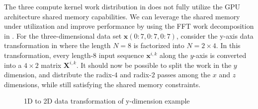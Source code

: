\documentclass[11pt, onecolumn, journal,compsoc]{IEEEtran}
\theoremstyle{problemstyle}
\begin{document}
    The three compute kernel work distribution in  does not fully utilize the GPU architecture shared memory capabilities. We can leverage the shared memory under utilization and improve performance by using the FFT work decomposition in . For the three-dimensional data set $\bm{x}(0 \colon 7,0 \colon 7,0 \colon 7)$, consider the y-axis data transformation in  where the length $N=8$ is factorized into $N = 2 \times 4$. In this transformation, every length-$8$ input sequence $\bm{x}^{i,k}$ along the $y$-axis is converted into a $4 \times 2$ matrix $\bm{X}^{i,k}$. It should now be possible to split the work in the $y$ dimension, and distribute the radix-$4$ and radix-$2$ passes among the $x$ and $z$ dimensions, while still satisfying the shared memory constraints.

    \begin{figure}[H]  
      \centering  
    
      \caption{1D to 2D data transformation of y-dimension example}
      \label{fig:example_1d_to_2d_y_dimension}
      \end{figure}
\end{document}
